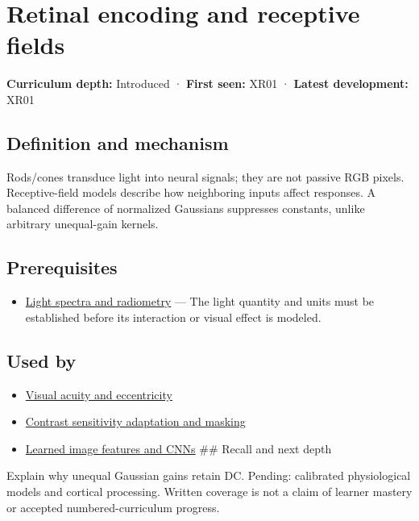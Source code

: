\hypertarget{appendix-7281c15ac44a}{}\label{referencestart:appendix-7281c15ac44a}
\section{Retinal encoding and receptive fields}\label{appendix-7281c15ac44a-retinal-encoding-and-receptive-fields}

\textbf{Curriculum depth:} Introduced · \textbf{First seen:} XR01 · \textbf{Latest development:} XR01

\subsection{Definition and mechanism}\label{appendix-7281c15ac44a-definition-and-mechanism}

Rods/cones transduce light into neural signals; they are not passive RGB pixels. Receptive-field models describe how neighboring inputs affect responses. A balanced difference of normalized Gaussians suppresses constants, unlike arbitrary unequal-gain kernels.

\subsection{Prerequisites}\label{appendix-7281c15ac44a-prerequisites}

\begin{itemize}
\tightlist
\item
  \hyperref[appendix-215c2570199b]{Light spectra and radiometry} --- The light quantity and units must be established before its interaction or visual effect is modeled.
\end{itemize}

\subsection{Used by}\label{appendix-7281c15ac44a-used-by}

\begin{itemize}
\item
  \hyperref[appendix-b491fc48c54b]{Visual acuity and eccentricity}
\item
  \hyperref[appendix-b3aa9e8e01ad]{Contrast sensitivity adaptation and masking}
\item
  \hyperref[appendix-47c51ea026fb]{Learned image features and CNNs} \#\# Recall and next depth
\end{itemize}

Explain why unequal Gaussian gains retain DC. Pending: calibrated physiological models and cortical processing. Written coverage is not a claim of learner mastery or accepted numbered-curriculum progress.

